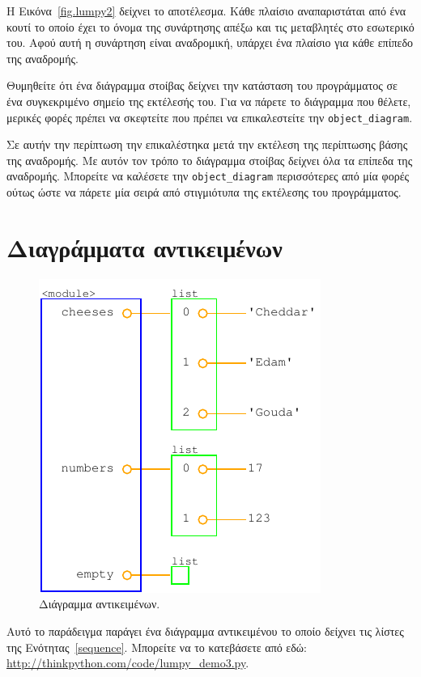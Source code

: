 \documentclass[10pt]{book}
\begin{document}
Η Εικόνα~\ref{fig.lumpy2} δείχνει το αποτέλεσμα.  Κάθε πλαίσιο αναπαριστάται από ένα κουτί το οποίο
έχει το όνομα της συνάρτησης απέξω και τις μεταβλητές στο εσωτερικό του.  Αφού αυτή η συνάρτηση είναι
αναδρομική, υπάρχει ένα πλαίσιο για κάθε επίπεδο της αναδρομής.

Θυμηθείτε ότι ένα διάγραμμα στοίβας δείχνει την κατάσταση του προγράμματος σε ένα συγκεκριμένο σημείο της
εκτέλεσής του.  Για να πάρετε το διάγραμμα που θέλετε, μερικές φορές πρέπει να σκεφτείτε που πρέπει να
επικαλεστείτε την \verb"object_diagram".

Σε αυτήν την περίπτωση την επικαλέστηκα μετά την εκτέλεση της περίπτωσης βάσης της αναδρομής.  Με αυτόν τον
τρόπο το διάγραμμα στοίβας δείχνει όλα τα επίπεδα της αναδρομής.  Μπορείτε να καλέσετε την
\verb"object_diagram" περισσότερες από μία φορές ούτως ώστε να πάρετε μία σειρά από στιγμιότυπα
της εκτέλεσης του προγράμματος.


\section{Διαγράμματα αντικειμένων}

\begin{figure}
\centerline
{\includegraphics[scale=0.7]{figs/lumpydemo3.pdf}}
\caption{Διάγραμμα αντικειμένων.}
\label{fig.lumpy3}
\end{figure}

Αυτό το παράδειγμα παράγει ένα διάγραμμα αντικειμένου το οποίο δείχνει τις λίστες της Ενότητας~\ref{sequence}.  Μπορείτε να το κατεβάσετε από εδώ: \url{http://thinkpython.com/code/lumpy_demo3.py}.
 
\end{document}
